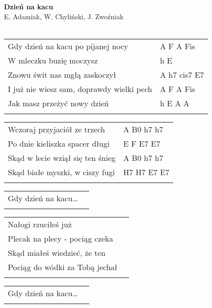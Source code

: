 \documentclass[a5paper]{article}
\begin{document}


\noindent
\fontsize{12pt}{15pt}\selectfont
\textbf{Dzień na kacu} \\
\fontsize{8pt}{10pt}\selectfont
E. Adamiak, W. Chyliński, J. Zwoźniak \\ \\
\fontsize{10pt}{12pt}\selectfont

\begin{tabular}{@{}p{7.00cm}p{3cm}@{}}
\noindent
Gdy dzień na kacu po pijanej nocy & A F A Fis \\
W mleczku buzię moczysz & h E \\
Znowu świt nas mgłą zaskoczył & A h7 cis7 E7 \\
I już nie wiesz sam, doprawdy wielki pech & A F A Fis \\
Jak masz przeżyć nowy dzień & h E A A \\ \\
\end{tabular}

\noindent
\begin{tabular}{@{}p{8.00cm}p{3cm}@{}}
Wczoraj przyjaciół ze trzech & A B0 h7 h7 \\
Po dnie kieliszka spacer długi & E F E7 E7 \\
Skąd w lecie wziął się ten śnieg & A B0 h7 h7 \\
Skąd białe myszki, w ciszy fugi & H7 H7 E7 E7 \\ \\
\end{tabular}

\noindent
\begin{tabular}{@{}p{7.50cm}p{3cm}@{}}
Gdy dzień na kacu… \\ \\
\end{tabular}

\noindent
\begin{tabular}{@{}p{7.50cm}p{3cm}@{}}
Nałogi rzuciłeś już \\
Plecak na plecy - pociąg czeka \\
Skąd miałeś wiedzieć, że ten \\
Pociąg do wódki za Tobą jechał \\ \\
\end{tabular}

\noindent
\begin{tabular}{@{}p{7.50cm}p{3cm}@{}}
   Gdy dzień na kacu… \\ \\
\end{tabular}
\end{document}
